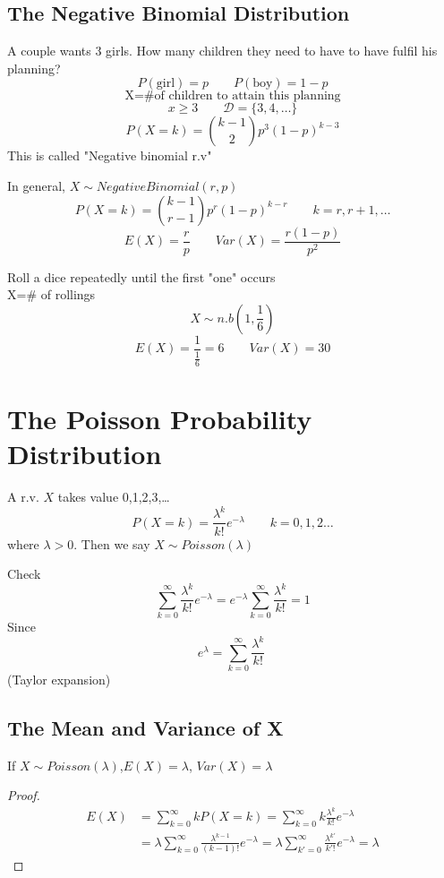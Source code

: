 \subsection{The Negative Binomial Distribution}
\begin{exmp}
A couple wants 3 girls. How many children they need to have to have fulfil his planning?
\[P(\text{girl})=p \qquad P(\text{boy})=1-p\]
\[\text{X=\# of children to attain this planning}\]
\[x\geq 3 \qquad \mathcal{D}=\{3,4,\dots\}\]
\[P(X=k)=\binom {k-1}{2} p^3(1-p)^{k-3}\]
This is called "Negative binomial r.v"
\end{exmp}

\begin{prop}
In general, $X \sim NegativeBinomial(r,p)$
\[P(X=k)=\binom {k-1}{r-1} p^r (1-p)^{k-r}  \qquad k=r,r+1,\dots	\]
\[E(X)=\frac{r}{p} \qquad  Var(X)=\frac{r(1-p)}{p^2} \]
\end{prop}
\begin{exmp}
Roll a dice repeatedly until the first "one" occurs\\
X=\# of rollings
\[X \sim n.b(1,\frac{1}{6})\]
\[E(X)=\frac{1}{\frac{1}{6}}=6  	\qquad Var(X)=30\]
\end{exmp}



\section{The Poisson Probability Distribution}
\begin{defn}
A r.v. $X$ takes value 0,1,2,3,\dots
 \[P(X=k)=\frac{\lambda^k}{k!} e^{-\lambda} \qquad k=0,1,2\dots\]
 where $\lambda >0$. Then we say $X \sim Poisson(\lambda)$
\end{defn}

Check
 \[\sum_{k=0}^{\infty} \frac{\lambda^k}{k!} e^{-\lambda}=e^{-\lambda} \sum_{k=0}^{\infty} \frac{\lambda^k}{k!} =1 \]
Since 
\[e^{\lambda}=\sum_{k=0}^{\infty} \frac{\lambda^k}{k!}  \ \](Taylor expansion)
\subsection{The Mean and Variance of X}
\begin{prop}
If $X \sim Poisson(\lambda)$,$E(X)=\lambda$, $Var(X)=\lambda$
\begin{proof}
\begin{align*}
E(X)&=\sum _{k=0}^{\infty}kP(X=k)=\sum _{k=0}^{\infty}  k \frac{\lambda^k}{k!} e^{-\lambda} \\
&=\lambda \sum _{k=0}^{\infty} \frac{\lambda^{k-1}}{(k-1)!} e^{-\lambda}=\lambda \sum _{k'=0}^{\infty} \frac{\lambda^{k'}}{k'!} e^{-\lambda}=\lambda
\end{align*}
\end{proof}
\end{prop}

